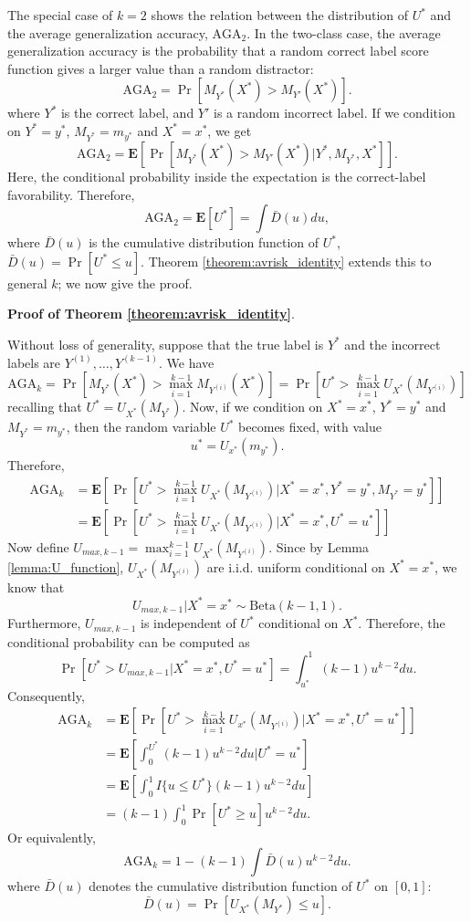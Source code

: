 \documentclass[twoside,11pt]{article}
\newcommand{\E}{\textbf{E}}
\begin{document}
The special case of $k=2$ shows the relation between the distribution of $U^*$ and the average generalization accuracy, $\text{AGA}_2$. In the two-class case, the average generalization accuracy is the probability that a random correct label score function gives a larger value than a random distractor:
\[
\text{AGA}_2 = \Pr[M_{Y^*}(X^*) > M_{Y'}(X^*)].
\]
where $Y^*$ is the correct label, and $Y'$ is a random incorrect label.
If we condition on $Y^* = y^*$, $M_{Y^*} = m_{y^*}$ and $X^* = x^*$, we get
\[
\text{AGA}_2 = \E[\Pr[M_{Y^*}(X^*) > M_{Y'}(X^*)|Y^*, M_{Y^*}, X^*]].
\]
Here, the conditional probability inside the expectation is the correct-label favorability.  Therefore,
\[
\text{AGA}_2 = \E[U^*] = \int \bar{D}(u) du,
\]
where $\bar{D}(u)$ is the cumulative distribution function of $U^*$, $\bar{D}(u) = \Pr[U^* \leq u]$.
Theorem \ref{theorem:avrisk_identity} extends this to general $k$; we now give the proof.\newline


\noindent\textbf{Proof of Theorem \ref{theorem:avrisk_identity}}.

Without loss of generality, suppose that the true label is $Y^*$ and the incorrect labels are $Y^{(1)},\hdots, Y^{(k-1)}$.
We have
\[
\text{AGA}_k = \Pr[M_{Y^*}(X^*) > \max_{i=1}^{k-1} M_{Y^{(i)}}(X^*)]
= \Pr[U^* > \max_{i=1}^{k-1} U_{X^*}(M_{Y^{(i)}})]
\]
recalling that $U^* = U_{X^*}(M_{Y^*})$.
Now, if we condition on $X^* = x^*$, $Y^* = y^*$ and $M_{Y^*} = m_{y^*}$,
then the random variable $U^*$ becomes fixed, with value
\[
u^* = U_{x^*}(m_{y^*}).
\]
Therefore,
\begin{align*}
\text{AGA}_k &=\E[\Pr[U^* > \max_{i=1}^{k-1} U_{X^*}(M_{Y^{(i)}})|X^* = x^*, Y^* = y^*, M_{Y^*} = y^*]]
\\&= \E[\Pr[U^* > \max_{i=1}^{k-1} U_{X^*}(M_{Y^{(i)}})|X^* = x^*, U^* = u^*]]
\end{align*}
Now define $U_{max, k-1} = \max_{i=1}^{k-1} U_{X^*}(M_{Y^{(i)}})$. 
Since by Lemma \ref{lemma:U_function},
$U_{X^*}(M_{Y^{(i)}})$ are i.i.d. uniform conditional on $X^* = x^*$, we know that
\begin{equation}\label{eq:umax_beta}
U_{max, k-1}|X^* = x^* \sim \text{Beta}(k-1, 1). 
\end{equation}
Furthermore, $U_{max, k-1}$ is independent of $U^*$ conditional on $X^*$.
Therefore, the conditional probability can be computed as
\[
\Pr[U^* > U_{max, k-1}|X^* = x^*, U^* = u^*] = \int_{u^*}^1 (k-1) u^{k-2} du.
\]
Consequently,
\begin{align*}
\text{AGA}_k &= \E[\Pr[U^* > \max_{i=1}^{k-1} U_{x^*}(M_{Y^{(i)}})|X^* = x^*, U^* = u^*]]
\\&= \E[\int_0^{U^*} (k-1) u^{k-2} du|U^* = u^*]
\\&= \E[\int_0^1 I\{u \leq U^*\} (k-1) u^{k-2} du ]
\\&= (k-1) \int_0^1 \Pr[U^* \geq u] u^{k-2} du.
\end{align*}
Or equivalently,
\[
\text{AGA}_k = 1 - (k-1) \int \bar{D}(u) u^{k-2} du.
\]
where $\bar{D}(u)$ denotes the cumulative distribution function of $U^*$ on $[0,1]$:
\begin{equation}\label{eq:Kbar}
\bar{D}(u) = \Pr[U_{X^*}(M_{Y^*}) \leq u].
\end{equation}
\end{document}
